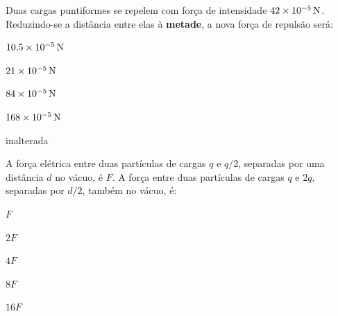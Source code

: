 \begin{questao}[1]{}
Duas cargas puntiformes se repelem com força de intensidade
$42\times 10^{-5}\,\si{\newton}$. Reduzindo-se a distância entre elas à
\textbf{metade}, a nova força de repulsão será:
\begin{alternativas}[2]
\item $10.5\times 10^{-5}\,\si{\newton}$
\item $21\times 10^{-5}\,\si{\newton}$
\item $84\times 10^{-5}\,\si{\newton}$
\item $168\times 10^{-5}\,\si{\newton}$
\item inalterada
\end{alternativas}
\end{questao}

\blocoaplicacao

\begin{questao}[2]{}
A força elétrica entre duas partículas de cargas $q$ e $q/2$, separadas por uma
distância $d$ no vácuo, é $F$. A força entre duas partículas de cargas $q$ e $2q$,
separadas por $d/2$, também no vácuo, é:
\begin{alternativas}[3]
\item $F$
\item $2F$
\item $4F$
\item $8F$
\item $16F$
\end{alternativas}
\end{questao}

